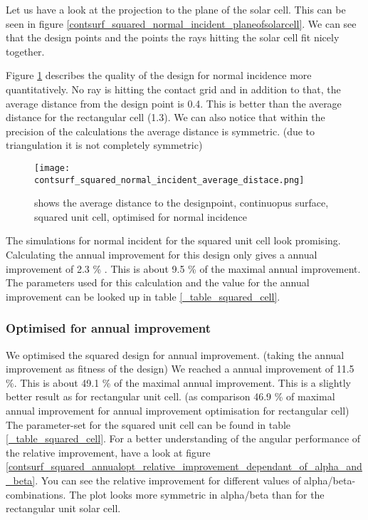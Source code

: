 Let us have a look at the projection to the plane of the solar cell. This can be seen in figure \ref{contsurf_squared_normal_incident_planeofsolarcell}. We can see that the design points and the points the rays hitting the solar cell fit nicely together. 


Figure \ref{contsurf_squared_normal_incident_average_distace} describes the quality of the design for normal incidence more quantitatively. No ray is hitting the contact grid and in addition to that, the average distance from the design point is 0.4. This is better than the average distance for the rectangular cell (1.3). We can also notice that within the precision of the calculations the average distance is symmetric. (due to triangulation it is not completely symmetric)

\begin{figure}[h]
\centering
\texttt{[image: contsurf\_squared\_normal\_incident\_average\_distace.png]}
\caption{shows the average distance to the designpoint, continuopus surface, squared unit cell, optimised for normal incidence \label{contsurf_squared_normal_incident_average_distace}}
\end{figure}

The simulations for normal incident for the squared unit cell look promising. Calculating the annual improvement for this design only gives a annual improvement of 2.3 \% . This is about 9.5 \% of the maximal annual improvement. The parameters used for this calculation and the value for the annual improvement can be looked up in table \ref{_table_squared_cell}. 

\subsubsection{Optimised for annual improvement}

We optimised the squared design for annual improvement. (taking the annual improvement as fitness of the design) We reached a annual improvement of 11.5 \%. This is about 49.1 \% of the maximal annual improvement. This is a slightly better result as for rectangular unit cell. (as comparison 46.9 \% of maximal annual improvement for annual improvement optimisation for rectangular cell) 
The parameter-set for the squared unit cell can be found in table \ref{_table_squared_cell}. For a better understanding of the angular performance of the relative improvement, have a look at figure \ref{contsurf_squared_annualopt_relative_improvement_dependant_of_alpha_and_beta}. You can see the relative improvement for different values of alpha/beta-combinations. The plot looks more symmetric in alpha/beta than for the rectangular unit solar cell. 

